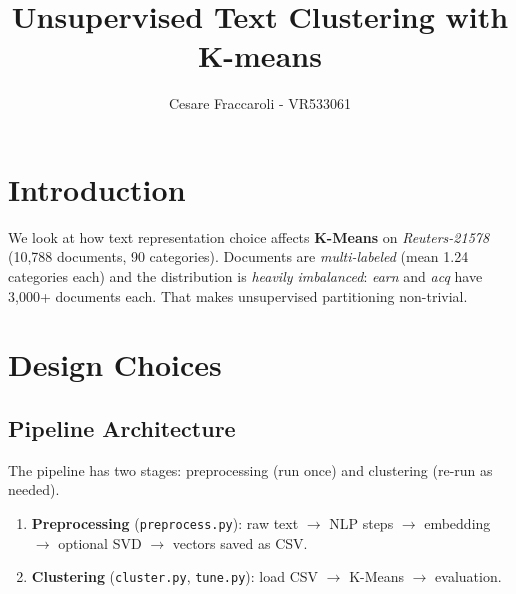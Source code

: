 \documentclass[twocolumn]{article}
\title{Unsupervised Text Clustering with K-means}
\author{Cesare Fraccaroli - VR533061}
\affil{NLP Course Project}
\date{}
\begin{document}

\section{Introduction}

We look at how text representation choice affects \textbf{K-Means} on \textit{Reuters-21578} (10,788 documents, 90 categories). Documents are \textit{multi-labeled} (mean 1.24 categories each) and the distribution is \textit{heavily imbalanced}: \textit{earn} and \textit{acq} have 3,000+ documents each. That makes unsupervised partitioning non-trivial.

\section{Design Choices}

\subsection{Pipeline Architecture}

The pipeline has two stages: preprocessing (run once) and clustering (re-run as needed).

\begin{enumerate}
    \item \textbf{Preprocessing} (\texttt{preprocess.py}): raw text $\rightarrow$ NLP steps $\rightarrow$ embedding $\rightarrow$ optional SVD $\rightarrow$ vectors saved as CSV.
    \item \textbf{Clustering} (\texttt{cluster.py}, \texttt{tune.py}): load CSV $\rightarrow$ K-Means $\rightarrow$ evaluation.
\end{enumerate}
\end{document}
